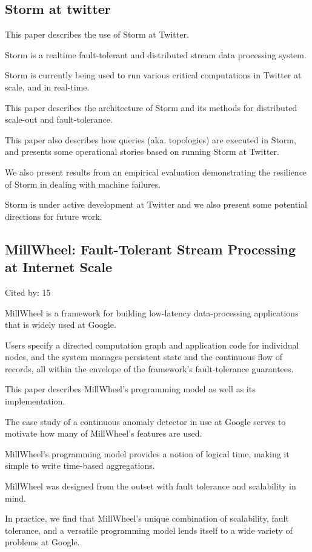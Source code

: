 \documentclass[a4paper,11pt]{article}
\begin{document}
\subsection*{Storm at twitter}
{\color{cyan} {\color{magenta}}

This paper describes the use of Storm at Twitter. 

{\color{black} Storm\cite{storm}} 
is a realtime fault-tolerant and distributed stream data processing system.

Storm is currently being used to run various critical computations in Twitter at scale, and in real-time. 

This paper describes the architecture of Storm and its methods for distributed scale-out and fault-tolerance. 

This paper also describes how queries (aka. topologies) are executed in Storm, 
and presents some operational stories based on running Storm at Twitter. 

We also present results from an empirical evaluation demonstrating the resilience of
Storm in dealing with machine failures. 

Storm is under active development at Twitter and we also present some potential directions for future work.

}

\subsection*{MillWheel: Fault-Tolerant Stream Processing at Internet Scale}
{\color{cyan} {\color{magenta} Cited by: 15}

{\color{black} MillWheel\cite{millwheel}}
is a framework for building low-latency data-processing applications that is widely used at Google. 

Users specify a directed computation graph and application code for individual nodes, and
the system manages persistent state and the continuous flow of records, 
all within the envelope of the framework's fault-tolerance guarantees.

This paper describes MillWheel's programming model as well as its implementation. 

The case study of a continuous anomaly detector in use at Google serves 
to motivate how many of MillWheel's features are used. 

MillWheel's programming model provides a notion of logical time, 
making it simple to write time-based aggregations.

MillWheel was designed from the outset with fault tolerance and scalability in mind. 

In practice, we find that 
MillWheel's unique combination of scalability, fault tolerance, and a versatile programming model 
lends itself to a wide variety of problems at Google.

}
\end{document}
